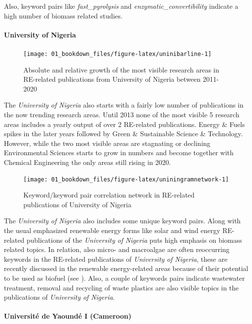 \documentclass[
]{book}
\begin{document}
Also, keyword pairs like \emph{fast\_pyrolysis} and \emph{enzymatic\_convertibility} indicate a high number of biomass related studies.

\hypertarget{university-of-nigeria}{%
\paragraph{University of Nigeria}\label{university-of-nigeria}}

\begin{figure}
\texttt{[image: 01\_bookdown\_files/figure-latex/uninibarline-1]} \caption{Absolute and relative growth of the most visible research areas in RE-related publications from University of Nigeria between 2011-2020}\label{fig:uninibarline}
\end{figure}

The \emph{University of Nigeria} also starts with a fairly low number of publications in the now trending research areas. Until 2013 none of the most visible 5 research areas includes a yearly output of over 2 RE-related publications. Energy \& Fuels spikes in the later years followed by Green \& Sustainable Science \& Technology. However, while the two most visible areas are stagnating or declining Environmental Sciences starts to grow in numbers and become together with Chemical Engineering the only areas still rising in 2020.

\begin{figure}
\texttt{[image: 01\_bookdown\_files/figure-latex/uniningramnetwork-1]} \caption{Keyword/keyword pair correlation network in RE-related publications of University of Nigeria}\label{fig:uniningramnetwork}
\end{figure}

The \emph{University of Nigeria} also includes some unique keyword pairs. Along with the usual emphasized renewable energy forms like solar and wind energy RE-related publications of the \emph{University of Nigeria} puts high emphasis on biomass related topics. In relation, also micro- and macroalgae are often reoccurring keywords in the RE-related publications of \emph{University of Nigeria}, these are recently discussed in the renewable energy-related areas because of their potential to be used as biofuel (see \citet{khan2018}). Also, a couple of keywords pairs indicate wastewater treatment, removal and recycling of waste plastics are also visible topics in the publications of \emph{University of Nigeria}.

\hypertarget{universituxe9-de-yaounduxe9-i-cameroon}{%
\paragraph{Université de Yaoundé I (Cameroon)}\label{universituxe9-de-yaounduxe9-i-cameroon}}
\end{document}
